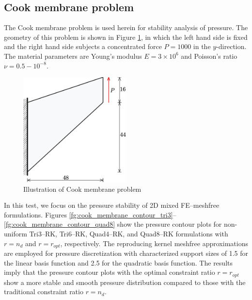 \subsection{Cook membrane problem}

The Cook membrane problem \cite{simo1990} is used herein for stability analysis of pressure. The geometry of this problem is shown in Figure \ref{fg:cook_illsutration}, in which the left hand side is fixed and the right hand side subjects a concentrated force $P=1000$ in the $y$-direction. The material parameters are Young's modulus $E=3\times 10^6$ and Poisson's ratio $\nu=0.5-10^{-8}$.

\begin{figure}[H]
\centering
\includegraphics[width=0.5\textwidth]{png/cook_membrane_model.png}
\caption{Illustration of Cook membrane problem}\label{fg:cook_illsutration}
\end{figure}

In this test, we focus on the pressure stability of 2D mixed FE--meshfree formulations. Figures \ref{fg:cook_membrane_contour_tri3}--\ref{fg:cook_membrane_contour_quad8} show the pressure contour plots for non-uniform Tri3--RK, Tri6--RK, Quad4--RK, and Quad8--RK formulations with $r=n_d$ and $r=r_{opt}$, respectively. The reproducing kernel meshfree approximations are employed for pressure discretization with characterized support sizes of 1.5 for the linear basis function and 2.5 for the quadratic basis function. The results imply that the pressure contour plots with the optimal constraint ratio $r=r_{opt}$ show a more stable and smooth pressure distribution compared to those with the traditional constraint ratio $r=n_d$.


